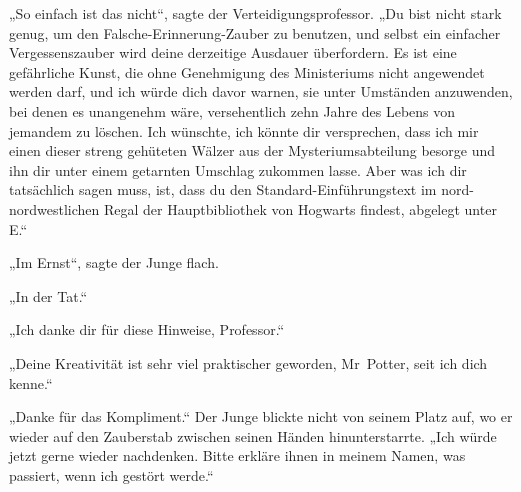„So einfach ist das nicht“, sagte der Verteidigungsprofessor.
„Du bist nicht stark genug, um den Falsche-Erinnerung-Zauber zu benutzen, und selbst ein einfacher Vergessenszauber wird deine derzeitige Ausdauer überfordern. Es ist eine gefährliche Kunst, die ohne Genehmigung des Ministeriums nicht angewendet werden darf, und ich würde dich davor warnen, sie unter Umständen anzuwenden, bei denen es unangenehm wäre, versehentlich zehn Jahre des Lebens von jemandem zu löschen. Ich wünschte, ich könnte dir versprechen, dass ich mir einen dieser streng gehüteten Wälzer aus der Mysteriumsabteilung besorge und ihn dir unter einem getarnten Umschlag zukommen lasse. Aber was ich dir tatsächlich sagen muss, ist, dass du den Standard-Einführungstext im nord-nordwestlichen Regal der Hauptbibliothek von Hogwarts findest, abgelegt unter E.“

„Im Ernst“, sagte der Junge flach.

„In der Tat.“

„Ich danke dir für diese Hinweise, Professor.“

„Deine Kreativität ist sehr viel praktischer geworden, Mr~Potter, seit ich dich kenne.“

„Danke für das Kompliment.“ Der Junge blickte nicht von seinem Platz auf, wo er wieder auf den Zauberstab zwischen seinen Händen hinunterstarrte.
„Ich würde jetzt gerne wieder nachdenken. Bitte erkläre ihnen in meinem Namen, was passiert, wenn ich gestört werde.“

